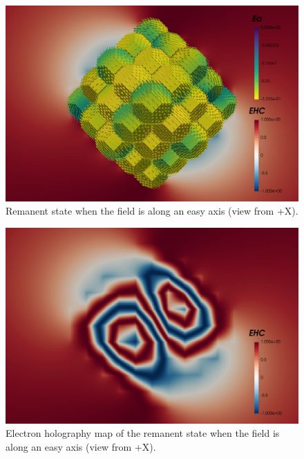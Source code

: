 \begin{figure}
\centering
\includegraphics[width=\textwidth]{research-4/figs/fram_i21_f0_-x.png}
\caption[Remanent state when the field is along an easy axis (view from +X)]{Remanent state when the field is along an easy axis (view from +X).}
\label{FIG_19}
\end{figure}

\begin{figure}
\centering
\includegraphics[width=\textwidth]{research-4/figs/fram_i21_f0_-x_EHC.png}
\caption[Electron holography map of the remanent state when the field is along an easy axis (view from +X)]{Electron holography map of the remanent state when the field is along an easy axis (view from +X).}
\label{FIG_20}
\end{figure}

